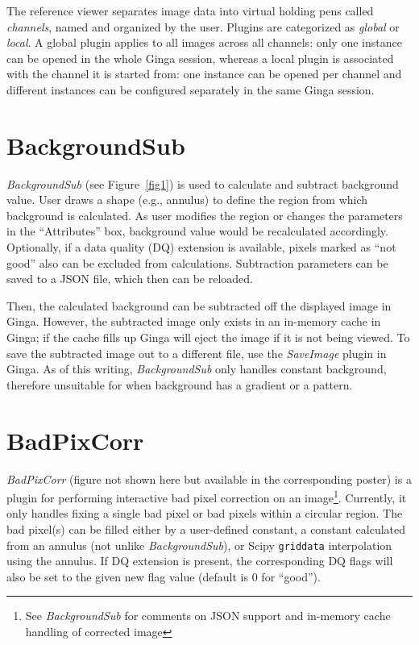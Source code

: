 \documentclass[11pt,twoside]{article}
\begin{document}
The reference viewer separates image data into virtual holding pens
called \emph{channels}, named and organized by the user.
Plugins are categorized as \emph{global} or \emph{local}.  A global
plugin applies to all images across all channels: only one instance can
be opened in the whole Ginga session, whereas a local plugin is
associated with the channel it is started from: one instance can be
opened per channel and different instances can be configured separately
in the same Ginga session.

\section{BackgroundSub}

{\em BackgroundSub} (see Figure~\ref{fig1}) is used to calculate and subtract
background value. User draws a shape (e.g., annulus) to define
the region from which background is calculated.
As user modifies the region or changes the parameters in the
``Attributes'' box, background value would be recalculated accordingly.
Optionally, if a data quality (DQ) extension is available, pixels marked as
``not good'' also can be excluded from calculations.
Subtraction parameters can be saved to a JSON file, which then can be reloaded.


Then, the calculated background can be subtracted off
the displayed image in Ginga.
However, the subtracted image only exists in an in-memory cache in Ginga;
if the cache fills up Ginga will eject the image if it is not being viewed.
To save the subtracted image out to a different file, use the {\em SaveImage}
plugin in Ginga.
As of this writing, {\em BackgroundSub} only handles constant
background, therefore unsuitable for when background has a gradient or a
pattern.

\section{BadPixCorr}

{\em BadPixCorr} (figure not shown here but available in the
corresponding poster) is a plugin for performing interactive bad pixel
correction on an image\footnote{See {\em BackgroundSub} for
comments on JSON support and in-memory cache handling of corrected image}.
Currently, it only handles fixing a single bad pixel or
bad pixels within a circular region.
The bad pixel(s) can be filled either by a user-defined constant, a constant
calculated from an annulus (not unlike {\em BackgroundSub}), or Scipy
{\tt griddata} interpolation using the annulus.
If DQ extension is present, the corresponding DQ flags will also be set
to the given new flag value (default is 0 for ``good'').
\end{document}
